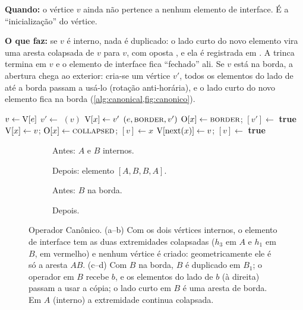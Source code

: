 \textbf{Quando:} o vértice $v$ ainda não pertence a nenhum elemento de interface. É a ``inicialização'' do vértice.

\textbf{O que faz:} se $v$ é interno, nada é duplicado: o lado curto do novo elemento vira uma aresta colapsada de $v$
para $v$, com oposta \COLLAPSED, e ela é registrada em . A trinca termina em $v$ e o elemento de
interface fica ``fechado'' ali. Se $v$ está na borda, a abertura chega ao exterior: cria-se um vértice $v'$, todos os
elementos do lado de  até a borda passam a usá-lo (rotação anti-horária), e o lado curto do novo elemento
fica na borda (\cref{alg:canonical,fig:canonico}).

\begin{algorithm}[ht]
\caption{$(e, x)$ \quad ($e$ = , $x$ = )}
\label{alg:canonical}
\begin{algorithmic}[1]
\State $v\gets\mathrm{V}[e]$
 
  \State $v'\gets$ $(v)$
  \State $\mathrm{V}[x]\gets v'$
  \State {}$(e, \textsc{border}, v')$ 
  \State $\mathrm{O}[x]\gets\textsc{border}$; \quad {}$[v']\gets$ \textbf{true}
\Else
  \State $\mathrm{V}[x]\gets v$; \quad $\mathrm{O}[x]\gets\textsc{collapsed}$; \quad {}$[v]\gets x$
\EndIf
\State $\mathrm{V}[\mathrm{next}(x)]\gets v$; \quad {}$[v]\gets$ \textbf{true}
\end{algorithmic}
\end{algorithm}

\begin{figure}[ht]
\centering
\begin{subfigure}[b]{0.28\linewidth}\centering\caption{Antes: $A$ e $B$ internos.}\end{subfigure}\hfill
\begin{subfigure}[b]{0.28\linewidth}\centering\caption{Depois: elemento $[A,B,B,A]$.}\end{subfigure}\hfill
\begin{subfigure}[b]{0.2\linewidth}\centering\caption{Antes: $B$ na borda.}\end{subfigure}\hfill
\begin{subfigure}[b]{0.2\linewidth}\centering\caption{Depois.}\end{subfigure}
\caption{Operador Canônico. (a--b) Com os dois vértices internos, o elemento de interface tem as duas extremidades
colapsadas ($h_3$ em $A$ e $h_1$ em $B$, em vermelho) e nenhum vértice é criado: geometricamente ele é só a aresta $AB$.
(c--d) Com $B$ na borda, $B$ é duplicado em $B_1$; o operador em $B$ recebe $b$, e os elementos do lado de $b$ (à
direita) passam a usar a cópia; o lado curto em $B$ é uma aresta de borda. Em $A$ (interno) a extremidade continua colapsada.}
\label{fig:canonico}
\end{figure}

